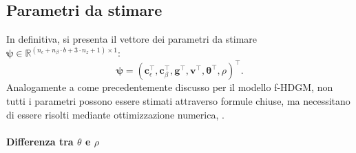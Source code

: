 \subsection[Parametri da stimare]{Parametri da stimare}
In definitiva, si presenta il vettore dei parametri da stimare $\boldsymbol{\psi}\in\mathbb{R}^{(n_\epsilon + n_\beta\cdot b + 3\cdot n_z+1)\times 1}$:
\begin{equation}
	\boldsymbol{\psi} = (\mathbf{c}_\epsilon^\top, \mathbf{c}_\beta^\top, \mathbf{g}^\top, \mathbf{v}^\top, \boldsymbol{\theta}^\top, \rho)^\top.
\end{equation}
Analogamente a come precedentemente discusso per il modello f-HDGM, non tutti i parametri possono essere stimati attraverso formule chiuse, ma necessitano di essere risolti mediante ottimizzazione numerica, .


\paragraph[Differenza tra $\theta$ e $\rho$]{Differenza tra $\theta$ e $\rho$}


